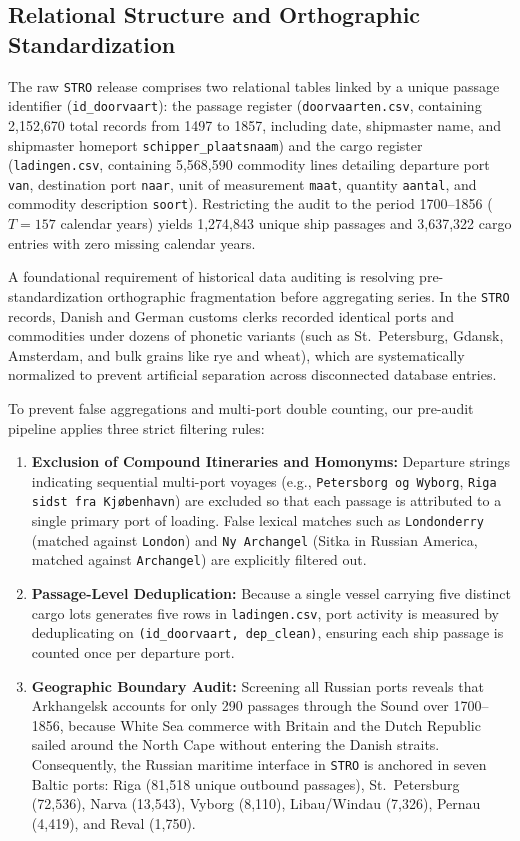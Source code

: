 \documentclass[11pt,a4paper]{article}
\begin{document}
\subsection{Relational Structure and Orthographic Standardization}
The raw \texttt{STRO} release comprises two relational tables linked by a unique passage identifier (\texttt{id\_doorvaart}): the passage register (\texttt{doorvaarten.csv}, containing 2,152,670 total records from 1497 to 1857, including date, shipmaster name, and shipmaster homeport \texttt{schipper\_plaatsnaam}) and the cargo register (\texttt{ladingen.csv}, containing 5,568,590 commodity lines detailing departure port \texttt{van}, destination port \texttt{naar}, unit of measurement \texttt{maat}, quantity \texttt{aantal}, and commodity description \texttt{soort}). Restricting the audit to the period 1700--1856 ($T = 157$ calendar years) yields 1,274,843 unique ship passages and 3,637,322 cargo entries with zero missing calendar years.

A foundational requirement of historical data auditing is resolving pre-standardization orthographic fragmentation before aggregating series. In the \texttt{STRO} records, Danish and German customs clerks recorded identical ports and commodities under dozens of phonetic variants (such as St.~Petersburg, Gdansk, Amsterdam, and bulk grains like rye and wheat), which are systematically normalized to prevent artificial separation across disconnected database entries.


To prevent false aggregations and multi-port double counting, our pre-audit pipeline applies three strict filtering rules:
\begin{enumerate}
\item \textbf{Exclusion of Compound Itineraries and Homonyms:} Departure strings indicating sequential multi-port voyages (e.g., \texttt{Petersborg og Wyborg}, \texttt{Riga sidst fra Kjøbenhavn}) are excluded so that each passage is attributed to a single primary port of loading. False lexical matches such as \texttt{Londonderry} (matched against \texttt{London}) and \texttt{Ny Archangel} (Sitka in Russian America, matched against \texttt{Archangel}) are explicitly filtered out.
\item \textbf{Passage-Level Deduplication:} Because a single vessel carrying five distinct cargo lots generates five rows in \texttt{ladingen.csv}, port activity is measured by deduplicating on \texttt{(id\_doorvaart, dep\_clean)}, ensuring each ship passage is counted once per departure port.

\item \textbf{Geographic Boundary Audit:} Screening all Russian ports reveals that Arkhangelsk accounts for only 290 passages through the Sound over 1700--1856, because White Sea commerce with Britain and the Dutch Republic sailed around the North Cape without entering the Danish straits. Consequently, the Russian maritime interface in \texttt{STRO} is anchored in seven Baltic ports: Riga (81,518 unique outbound passages), St.~Petersburg (72,536), Narva (13,543), Vyborg (8,110), Libau/Windau (7,326), Pernau (4,419), and Reval (1,750).
\end{enumerate}
\end{document}
